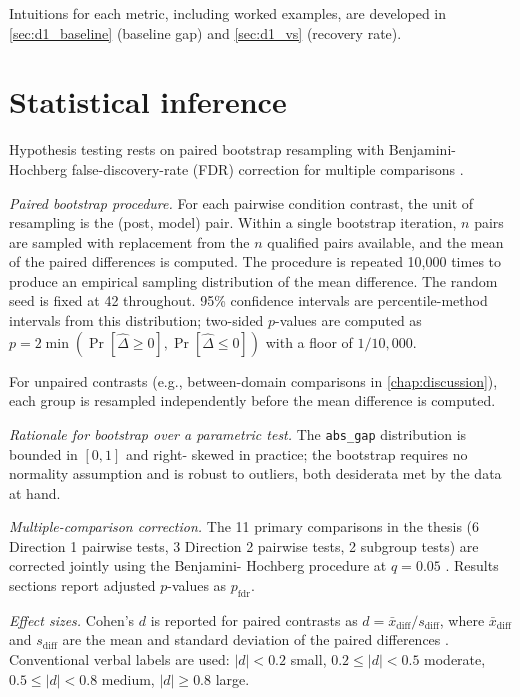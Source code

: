 Intuitions for each metric, including worked examples, are developed
in \cref{sec:d1_baseline} (baseline gap) and \cref{sec:d1_vs}
(recovery rate).

\section{Statistical inference}
\label{sec:m_stats}

Hypothesis testing rests on paired bootstrap resampling with
Benjamini-Hochberg false-discovery-rate (FDR) correction for multiple
comparisons \citep{efron-1979-bootstrap, benjamini-1995-fdr}.

\textit{Paired bootstrap procedure.} For each pairwise condition
contrast, the unit of resampling is the (post, model) pair. Within a
single bootstrap iteration, $n$ pairs are sampled with replacement
from the $n$ qualified pairs available, and the mean of the paired
differences is computed. The procedure is repeated 10,000 times to
produce an empirical sampling distribution of the mean difference. The
random seed is fixed at 42 throughout. 95\% confidence intervals are
percentile-method intervals from this distribution; two-sided
$p$-values are computed as
$p = 2 \min(\Pr[\hat{\Delta} \geq 0], \Pr[\hat{\Delta} \leq 0])$
with a floor of $1 / 10{,}000$.

For unpaired contrasts (e.g., between-domain comparisons in
\cref{chap:discussion}), each group is resampled independently before
the mean difference is computed.

\textit{Rationale for bootstrap over a parametric test.} The
\texttt{abs\_gap} distribution is bounded in $[0, 1]$ and right-
skewed in practice; the bootstrap requires no normality assumption and
is robust to outliers, both desiderata met by the data at hand.

\textit{Multiple-comparison correction.} The 11 primary comparisons
in the thesis (6 Direction 1 pairwise tests, 3 Direction 2 pairwise
tests, 2 subgroup tests) are corrected jointly using the Benjamini-
Hochberg procedure at $q = 0.05$ \citep{benjamini-1995-fdr}. Results
sections report adjusted $p$-values as $p_\text{fdr}$.

\textit{Effect sizes.} Cohen's $d$ is reported for paired contrasts as
$d = \bar{x}_\text{diff} / s_\text{diff}$, where $\bar{x}_\text{diff}$
and $s_\text{diff}$ are the mean and standard deviation of the paired
differences \citep{cohen-1988-effect-size}. Conventional verbal
labels are used: $|d| < 0.2$ small, $0.2 \leq |d| < 0.5$ moderate,
$0.5 \leq |d| < 0.8$ medium, $|d| \geq 0.8$ large.

